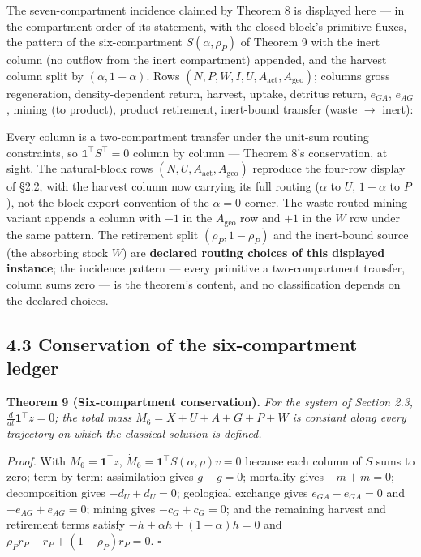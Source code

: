 \documentclass[11pt]{article}
\begin{document}
The seven-compartment incidence claimed by Theorem 8 is displayed here --- in the compartment order of its statement, with the closed block's primitive fluxes, the pattern of the six-compartment \(S(\alpha,\rho_P)\) of Theorem 9 with the inert column (no outflow from the inert compartment) appended, and the harvest column split by \((\alpha,1-\alpha)\). Rows \((N,\allowbreak{}P,\allowbreak{}W,\allowbreak{}I,\allowbreak{}U,\allowbreak{}A_{\mathrm{act}},\allowbreak{}A_{\mathrm{geo}})\); columns gross regeneration, density-dependent return, harvest, uptake, detritus return, \(e_{GA}\), \(e_{AG}\), mining (to product), product retirement, inert-bound transfer (waste \(\to\) inert):

Every column is a two-compartment transfer under the unit-sum routing constraints, so \(\mathbb 1^{\top}S^{\top}=0\) column by column --- Theorem 8's conservation, at sight. The natural-block rows \((N,\allowbreak{}U,\allowbreak{}A_{\mathrm{act}},\allowbreak{}A_{\mathrm{geo}})\) reproduce the four-row display of \S2.2, with the harvest column now carrying its full routing (\(\alpha\) to \(U\), \(1-\alpha\) to \(P\)), not the block-export convention of the \(\alpha=0\) corner. The waste-routed mining variant appends a column with \(-1\) in the \(A_{\mathrm{geo}}\) row and \(+1\) in the \(W\) row under the same pattern. The retirement split \((\rho_P,1-\rho_P)\) and the inert-bound source (the absorbing stock \(W\)) are \textbf{declared routing choices of this displayed instance}; the incidence pattern --- every primitive a two-compartment transfer, column sums zero --- is the theorem's content, and no classification depends on the declared choices.

\subsection*{4.3 Conservation of the six-compartment ledger}\label{43-conservation-of-the-six-compartment-ledger}

\textbf{Theorem 9 (Six-compartment conservation).} \emph{For the system of Section 2.3, \(\frac{d}{dt}\mathbf{1}^\top z =\allowbreak{} 0\); the total mass \(M_6 = X + U + A + G + P + W\) is constant along every trajectory on which the classical solution is defined.}

\emph{Proof.} With \(M_6 = \mathbf{1}^\top z\), \(\dot M_6 =\allowbreak{} \mathbf{1}^\top S(\alpha,\allowbreak{}\rho) v =\allowbreak{} 0\) because each column of \(S\) sums to zero; term by term: assimilation gives \(g - g = 0\); mortality gives \(-m + m = 0\); decomposition gives \(-d_U + d_U = 0\); geological exchange gives \(e_{GA} - e_{GA} = 0\) and \(-e_{AG} + e_{AG} = 0\); mining gives \(-c_G + c_G = 0\); and the remaining harvest and retirement terms satisfy \(-h +\allowbreak{} \alpha h +\allowbreak{} (1-\alpha)h =\allowbreak{} 0\) and \(\rho_P r_P - r_P +\allowbreak{} (1-\rho_P)r_P =\allowbreak{} 0\). \(\square\)
\end{document}
